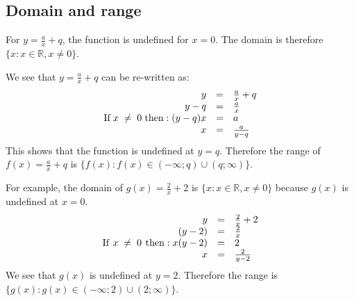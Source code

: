 \subsection*{Domain and range}
\nopagebreak
For $y=\frac{a}{x}+q$, the function is undefined for $x=0$. The domain is therefore $\{x:x\in \mathbb{R},x\ne 0\}$.\par 
We see that $y=\frac{a}{x}+q$ can be re-written as:
\begin{equation*}
\begin{array}{ccc}\hfill y& =& \frac{a}{x}+q\hfill \\
 \hfill y-q& =& \frac{a}{x}\hfill \\
 \hfill \mbox{If}\phantom{\rule{3pt}{0ex}}x\; \ne \;  0 \phantom{\rule{3pt}{0ex}}\mbox{then}:(y-q)x& =& a\hfill \\
 \hfill x& =& \frac{a}{y-q}\hfill 
\end{array}
\end{equation*}
This shows that the function is undefined at $y=q$. Therefore the range of $f(x)=\frac{a}{x}+q$ is $\{f(x):f(x)\in (-\infty ;q)\cup (q;\infty )\}$.\par 
For example, the domain of $g(x)=\frac{2}{x}+2$ is $\{x:x\in \mathbb{R},x\ne 0\}$ because $g(x)$ is undefined at $x=0$.
\begin{equation*}
\begin{array}{ccc}\hfill y& =& \frac{2}{x}+2\hfill \\
 \hfill (y-2)& =& \frac{2}{x}\hfill \\
 \hfill \mbox{If}\phantom{\rule{4pt}{0ex}}x\; \ne \;  0 \phantom{\rule{4pt}{0ex}}\mbox{then}:x(y-2)& =& 2\hfill \\ 
\hfill x& =& \frac{2}{y-2}\hfill 
\end{array}
\end{equation*}
We see that $g(x)$ is undefined at $y=2$. Therefore the range is $\{g(x):g(x)\in (-\infty ;2)\cup (2;\infty )\}$.\par 

